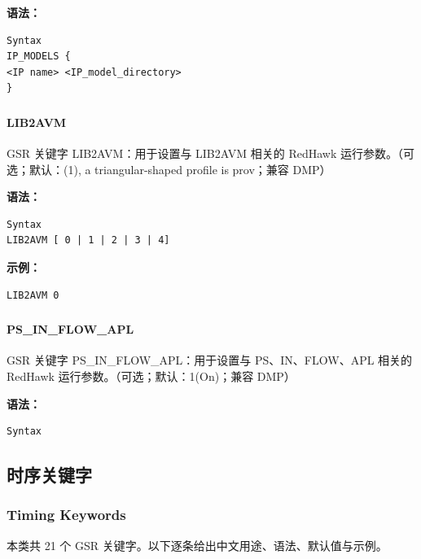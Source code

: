 \textbf{语法：}
\begin{lstlisting}
Syntax
IP_MODELS {
<IP name> <IP_model_directory>
}
\end{lstlisting}

\subsubsection{}
\paragraph*{LIB2AVM}

GSR 关键字 LIB2AVM：用于设置与 LIB2AVM 相关的 RedHawk 运行参数。（可选；默认：(1), a triangular-shaped profile is prov；兼容 DMP）

\textbf{语法：}
\begin{lstlisting}
Syntax
LIB2AVM [ 0 | 1 | 2 | 3 | 4]
\end{lstlisting}

\textbf{示例：}
\begin{lstlisting}
LIB2AVM 0
\end{lstlisting}

\subsubsection{}
\paragraph*{PS_IN_FLOW_APL}

GSR 关键字 PS_IN_FLOW_APL：用于设置与 PS、IN、FLOW、APL 相关的 RedHawk 运行参数。（可选；默认：1(On)；兼容 DMP）

\textbf{语法：}
\begin{lstlisting}
Syntax
\end{lstlisting}

\subsection{时序关键字}
\subsubsection*{Timing Keywords}

本类共 21 个 GSR 关键字。以下逐条给出中文用途、语法、默认值与示例。

\subsubsection{}
